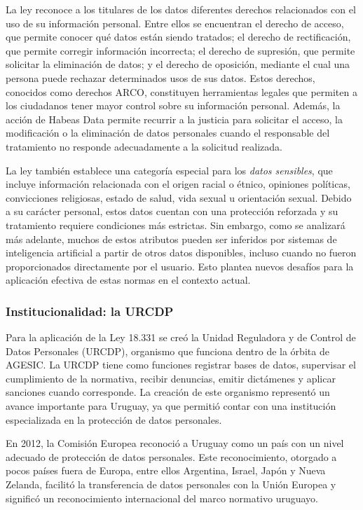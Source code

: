 \documentclass[11pt,a4paper]{article}
\begin{document}
La ley reconoce a los titulares de los datos diferentes derechos relacionados con el uso de su información personal. Entre ellos se encuentran el derecho de acceso, que permite conocer qué datos están siendo tratados; el derecho de rectificación, que permite corregir información incorrecta; el derecho de supresión, que permite solicitar la eliminación de datos; y el derecho de oposición, mediante el cual una persona puede rechazar determinados usos de sus datos. Estos derechos, conocidos como derechos ARCO, constituyen herramientas legales que permiten a los ciudadanos tener mayor control sobre su información personal. Además, la acción de Habeas Data permite recurrir a la justicia para solicitar el acceso, la modificación o la eliminación de datos personales cuando el responsable del tratamiento no responde adecuadamente a la solicitud realizada.

La ley también establece una categoría especial para los \textit{datos sensibles}, que incluye información relacionada con el origen racial o étnico, opiniones políticas, convicciones religiosas, estado de salud, vida sexual u orientación sexual. Debido a su carácter personal, estos datos cuentan con una protección reforzada y su tratamiento requiere condiciones más estrictas. Sin embargo, como se analizará más adelante, muchos de estos atributos pueden ser inferidos por sistemas de inteligencia artificial a partir de otros datos disponibles, incluso cuando no fueron proporcionados directamente por el usuario. Esto plantea nuevos desafíos para la aplicación efectiva de estas normas en el contexto actual.

\subsubsection{Institucionalidad: la URCDP}

Para la aplicación de la Ley 18.331 se creó la Unidad Reguladora y de Control de Datos Personales (URCDP), organismo que funciona dentro de la órbita de AGESIC. La URCDP tiene como funciones registrar bases de datos, supervisar el cumplimiento de la normativa, recibir denuncias, emitir dictámenes y aplicar sanciones cuando corresponde. La creación de este organismo representó un avance importante para Uruguay, ya que permitió contar con una institución especializada en la protección de datos personales.

En 2012, la Comisión Europea reconoció a Uruguay como un país con un nivel adecuado de protección de datos personales. Este reconocimiento, otorgado a pocos países fuera de Europa, entre ellos Argentina, Israel, Japón y Nueva Zelanda, facilitó la transferencia de datos personales con la Unión Europea y significó un reconocimiento internacional del marco normativo uruguayo.
\end{document}
